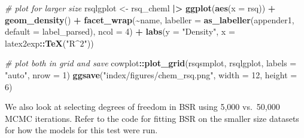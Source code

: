 \documentclass[12pt, twoside]{amherstthesis}
\newenvironment{Shaded}{\begin{snugshade}}{\end{snugshade}}
\newcommand{\AttributeTok}[1]{\textcolor[rgb]{0.13,0.29,0.53}{#1}}
\newcommand{\CommentTok}[1]{\textcolor[rgb]{0.56,0.35,0.01}{\textit{#1}}}
\newcommand{\DecValTok}[1]{\textcolor[rgb]{0.00,0.00,0.81}{#1}}
\newcommand{\FunctionTok}[1]{\textcolor[rgb]{0.13,0.29,0.53}{\textbf{#1}}}
\newcommand{\NormalTok}[1]{#1}
\newcommand{\OtherTok}[1]{\textcolor[rgb]{0.56,0.35,0.01}{#1}}
\newcommand{\SpecialCharTok}[1]{\textcolor[rgb]{0.81,0.36,0.00}{\textbf{#1}}}
\newcommand{\StringTok}[1]{\textcolor[rgb]{0.31,0.60,0.02}{#1}}
\begin{document}
\begin{Shaded}
\begin{Highlighting}[]
\CommentTok{\# plot for larger size}
\NormalTok{rsqlgplot }\OtherTok{\textless{}{-}}\NormalTok{ rsq\_cheml }\SpecialCharTok{|\textgreater{}} 
  \FunctionTok{ggplot}\NormalTok{(}\FunctionTok{aes}\NormalTok{(}\AttributeTok{x =}\NormalTok{ rsq)) }\SpecialCharTok{+}
  \FunctionTok{geom\_density}\NormalTok{() }\SpecialCharTok{+} 
  \FunctionTok{facet\_wrap}\NormalTok{(}\SpecialCharTok{\textasciitilde{}}\NormalTok{name, }
             \AttributeTok{labeller =} \FunctionTok{as\_labeller}\NormalTok{(appender1, }
                                    \AttributeTok{default =}\NormalTok{ label\_parsed), }
             \AttributeTok{ncol =} \DecValTok{4}\NormalTok{) }\SpecialCharTok{+}
  \FunctionTok{labs}\NormalTok{(}\AttributeTok{y =} \StringTok{"Density"}\NormalTok{, }\AttributeTok{x =}\NormalTok{ latex2exp}\SpecialCharTok{::}\FunctionTok{TeX}\NormalTok{(}\StringTok{"R$\^{}2$"}\NormalTok{))}

\CommentTok{\# plot both in grid and save}
\NormalTok{cowplot}\SpecialCharTok{::}\FunctionTok{plot\_grid}\NormalTok{(rsqsmplot, rsqlgplot, }\AttributeTok{labels =} \StringTok{"auto"}\NormalTok{, }\AttributeTok{nrow =} \DecValTok{1}\NormalTok{)}
\FunctionTok{ggsave}\NormalTok{(}\StringTok{"index/figures/chem\_rsq.png"}\NormalTok{, }\AttributeTok{width =} \DecValTok{12}\NormalTok{, }\AttributeTok{height =} \DecValTok{6}\NormalTok{)}
\end{Highlighting}
\end{Shaded}
\normalsize

We also look at selecting degrees of freedom in BSR using 5,000 vs.~50,000 MCMC iterations. Refer to the code for fitting BSR on the smaller size datasets for how the models for this test were run.
\end{document}
